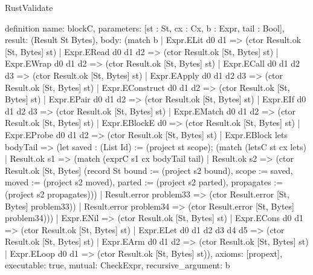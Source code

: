 \begin{lexlean}{RustValidate}
\begin{semanticmodule}
definition{
  name: blockC,
  parameters: [st : St, cx : Cx, b : Expr, tail : Bool],
  result: (Result St Bytes),
  body: (match b
    | Expr.ELit d0 d1 => (ctor Result.ok [St, Bytes] st)
    | Expr.ERead d0 d1 d2 => (ctor Result.ok [St, Bytes] st)
    | Expr.EWrap d0 d1 d2 => (ctor Result.ok [St, Bytes] st)
    | Expr.ECall d0 d1 d2 d3 => (ctor Result.ok [St, Bytes] st)
    | Expr.EApply d0 d1 d2 d3 => (ctor Result.ok [St, Bytes] st)
    | Expr.EConstruct d0 d1 d2 => (ctor Result.ok [St, Bytes] st)
    | Expr.EPair d0 d1 d2 => (ctor Result.ok [St, Bytes] st)
    | Expr.EIf d0 d1 d2 d3 => (ctor Result.ok [St, Bytes] st)
    | Expr.EMatch d0 d1 d2 => (ctor Result.ok [St, Bytes] st)
    | Expr.EBlockE d0 => (ctor Result.ok [St, Bytes] st)
    | Expr.EProbe d0 d1 d2 => (ctor Result.ok [St, Bytes] st)
    | Expr.EBlock lets bodyTail => (let saved : (List Id) := (project st scope); (match (letsC st cx lets)
      | Result.ok s1 => (match (exprC s1 cx bodyTail tail)
        | Result.ok s2 => (ctor Result.ok [St, Bytes] (record St {bound := (project s2 bound), scope := saved, moved := (project s2 moved), parted := (project s2 parted), propagates := (project s2 propagates)}))
        | Result.error problem33 => (ctor Result.error [St, Bytes] problem33))
      | Result.error problem34 => (ctor Result.error [St, Bytes] problem34)))
    | Expr.ENil => (ctor Result.ok [St, Bytes] st)
    | Expr.ECons d0 d1 => (ctor Result.ok [St, Bytes] st)
    | Expr.ELet d0 d1 d2 d3 d4 d5 => (ctor Result.ok [St, Bytes] st)
    | Expr.EArm d0 d1 d2 => (ctor Result.ok [St, Bytes] st)
    | Expr.ELoop d0 d1 => (ctor Result.ok [St, Bytes] st)),
  axioms: [propext],
  executable: true,
  mutual: CheckExpr,
  recursive_argument: b
}


\end{semanticmodule}
\end{lexlean}
